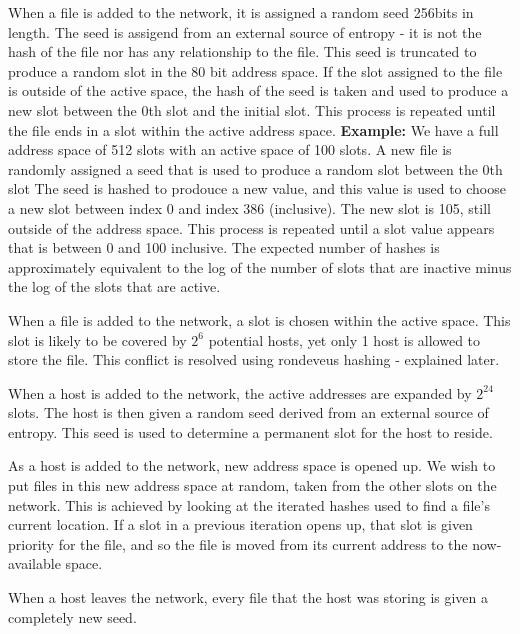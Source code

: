 \documentclass[twocolumn]{article}
\begin{document}
When a file is added to the network, it is assigned a random seed 256bits in length.
The seed is assigend from an external source of entropy - it is not the hash of the file nor has any relationship to the file.
This seed is truncated to produce a random slot in the 80 bit address space.
If the slot assigned to the file is outside of the active space, the hash of the seed is taken and used to produce a new slot between the 0th slot and the initial slot.
This process is repeated until the file ends in a slot within the active address space.
\textbf{Example:} We have a full address space of 512 slots with an active space of 100 slots.
A new file is randomly assigned a seed that is used to produce a random slot between the 0th slot
The seed is hashed to prodouce a new value, and this value is used to choose a new slot between index 0 and index 386 (inclusive).
The new slot is 105, still outside of the address space.
This process is repeated until a slot value appears that is between 0 and 100 inclusive.
The expected number of hashes is approximately equivalent to the log of the number of slots that are inactive minus the log of the slots that are active.

When a file is added to the network, a slot is chosen within the active space.
This slot is likely to be covered by $2^6$ potential hosts, yet only 1 host is allowed to store the file.
This conflict is resolved using rondeveus hashing - explained later.

When a host is added to the network, the active addresses are expanded by $2^{24}$ slots.
The host is then given a random seed derived from an external source of entropy.
This seed is used to determine a permanent slot for the host to reside.

As a host is added to the network, new address space is opened up.
We wish to put files in this new address space at random, taken from the other slots on the network.
This is achieved by looking at the iterated hashes used to find a file's current location.
If a slot in a previous iteration opens up, that slot is given priority for the file, and so the file is moved from its current address to the now-available space.

When a host leaves the network, every file that the host was storing is given a completely new seed.
\end{document}
